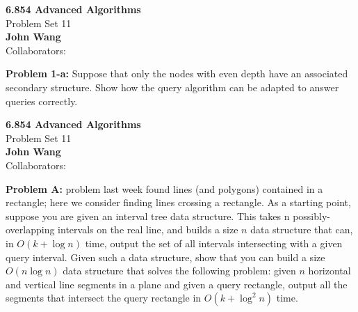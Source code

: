 \documentclass[psamsfonts]{amsart}
\newenvironment{sol}{\vspace{0.25cm}{\large \bfseries Solution:}}{\qedsymbol}
\newenvironment{prob}[1]{\begin{framed}{\large \bfseries Problem #1:}}{\end{framed}}
\newcommand{\makenewtitle}{
    \begin{center}
    {\huge \bfseries 6.854 Advanced Algorithms} \\
    Problem Set 11\\
    \vspace{0.25cm}
    {\bfseries John Wang} \\
    Collaborators:  
    \end{center}
    \vspace{0.5cm}
}
\begin{document}
\makenewtitle

\begin{prob}{1-a}
Suppose that only the nodes with even depth have an associated secondary structure. Show how the query algorithm can be adapted to answer queries correctly.
\end{prob}
\begin{sol}

\end{sol}

\newpage
\makenewtitle
\begin{prob}{2}
A problem last week found lines (and polygons) contained in a rectangle; here we consider finding lines crossing a rectangle. As a starting point, suppose you are given an interval tree data structure. This takes n possibly-overlapping intervals on the real line, and builds a size $n$ data structure that can, in $O(k + \log n)$ time, output the set of all intervals intersecting with a given query interval. Given such a data structure, show that you can build a size $O(n \log n)$ data structure that solves the following problem: given $n$ horizontal and vertical line segments in a plane and given a query rectangle, output all the segments that intersect the query rectangle in $O(k + \log^2 n)$ time. 
\end{prob}
\end{document}
